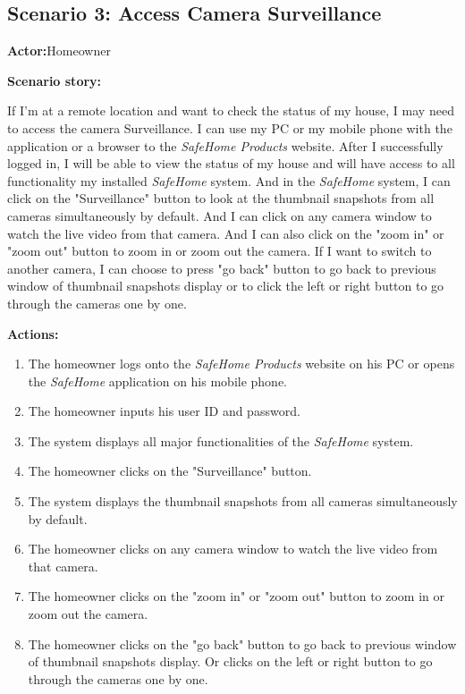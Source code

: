 \documentclass[twoside,11pt]{article}
\begin{document}

\subsection{Scenario 3: Access Camera Surveillance}

\textbf{Actor:}Homeowner

\textbf{Scenario story:}

If I'm at a remote location and want to check the status of my house, I may need to access the camera Surveillance. I can use my PC or my mobile phone with the application or a browser to the \emph{SafeHome Products} website. After I successfully logged in, I will be able to view the status of my house and will have access to all functionality my installed \emph{SafeHome} system. And in the \emph{SafeHome} system, I can click on the "Surveillance" button to look at the thumbnail snapshots from all cameras simultaneously by default. And I can click on any camera window to watch the live video from that camera. And I can also click on the "zoom in" or "zoom out" button to zoom in or zoom out the camera. If I want to switch to another camera, I can choose to press "go back" button to go back to previous window of thumbnail snapshots display or to click the left or right button to go through the cameras one by one.

\textbf{Actions:}

\begin{enumerate}
    \item The homeowner logs onto the \emph{SafeHome Products} website on his PC or opens the \emph{SafeHome} application on his mobile phone.
    \item The homeowner inputs his user ID and password.
    \item The system displays all major functionalities of the \emph{SafeHome} system.
    \item The homeowner clicks on the "Surveillance" button.
    \item The system displays the thumbnail snapshots from all cameras simultaneously by default.
    \item The homeowner clicks on any camera window to watch the live video from that camera.
    \item The homeowner clicks on the "zoom in" or "zoom out" button to zoom in or zoom out the camera.
    \item The homeowner clicks on the "go back" button to go back to previous window of thumbnail snapshots display. Or clicks on the left or right button to go through the cameras one by one.
\end{enumerate}
\end{document}
